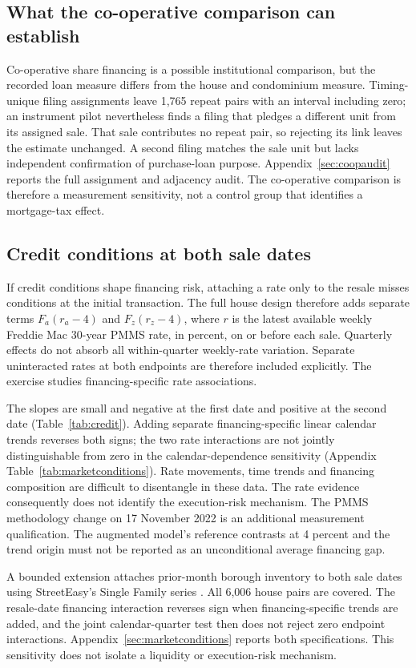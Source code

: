 \documentclass[12pt]{article}
\begin{document}
\subsection{What the co-operative comparison can establish}
Co-operative share financing is a possible institutional comparison, but the recorded loan measure differs from the house and condominium measure. Timing-unique filing assignments leave 1,765 repeat pairs with an interval including zero; an instrument pilot nevertheless finds a filing that pledges a different unit from its assigned sale. That sale contributes no repeat pair, so rejecting its link leaves the estimate unchanged. A second filing matches the sale unit but lacks independent confirmation of purchase-loan purpose. Appendix~\ref{sec:coopaudit} reports the full assignment and adjacency audit. The co-operative comparison is therefore a measurement sensitivity, not a control group that identifies a mortgage-tax effect.

\subsection{Credit conditions at both sale dates}
If credit conditions shape financing risk, attaching a rate only to the resale misses conditions at the initial transaction. The full house design therefore adds separate terms $F_a(r_a-4)$ and $F_z(r_z-4)$, where $r$ is the latest available weekly Freddie Mac 30-year PMMS rate, in percent, on or before each sale. Quarterly effects do not absorb all within-quarter weekly-rate variation. Separate uninteracted rates at both endpoints are therefore included explicitly. The exercise studies financing-specific rate associations.

The slopes are small and negative at the first date and positive at the second date (Table~\ref{tab:credit}). Adding separate financing-specific linear calendar trends reverses both signs; the two rate interactions are not jointly distinguishable from zero in the calendar-dependence sensitivity (Appendix Table~\ref{tab:marketconditions}). Rate movements, time trends and financing composition are difficult to disentangle in these data. The rate evidence consequently does not identify the execution-risk mechanism. The PMMS methodology change on 17 November 2022 is an additional measurement qualification. The augmented model's reference contrasts at 4 percent and the trend origin must not be reported as an unconditional average financing gap.


A bounded extension attaches prior-month borough inventory to both sale dates using StreetEasy's Single Family series \citep{streeteasy2026}. All 6,006 house pairs are covered. The resale-date financing interaction reverses sign when financing-specific trends are added, and the joint calendar-quarter test then does not reject zero endpoint interactions. Appendix~\ref{sec:marketconditions} reports both specifications. This sensitivity does not isolate a liquidity or execution-risk mechanism.
\end{document}
